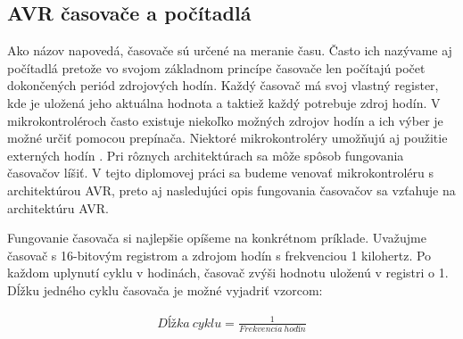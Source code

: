 \subsection{AVR časovače a počítadlá}
\noindent

Ako názov napovedá, časovače sú určené na meranie času. Často ich nazývame aj počítadlá
pretože vo svojom základnom princípe časovače len počítajú počet dokončených periód zdrojových hodín.
Každý časovač má svoj vlastný register, kde je uložená jeho aktuálna hodnota a taktiež každý potrebuje zdroj hodín. V mikrokontroléroch často existuje niekoľko možných zdrojov
hodín a ich výber je možné určiť pomocou prepínača. Niektoré mikrokontroléry umožňujú aj použitie
externých hodín \cite{IntroductionMicrocontrollerTimers}. Pri rôznych architektúrach sa môže spôsob fungovania časovačov líšiť. V tejto diplomovej práci sa budeme venovať
mikrokontroléru s architektúrou AVR, preto aj nasledujúci opis fungovania časovačov sa vzťahuje na architektúru AVR.\par
Fungovanie časovača si najlepšie opíšeme na konkrétnom príklade.
Uvažujme časovač s 16-bitovým registrom a zdrojom hodín s frekvenciou 1 kilohertz. Po každom uplynutí cyklu v hodinách, časovač
zvýši hodnotu uloženú v registri o 1. Dĺžku jedného cyklu časovača je možné vyjadriť vzorcom:

\begin{equation}
    \begin{aligned}
        Dĺžka\:cyklu = \frac{1}{Frekvencia\:hodín}
    \end{aligned}
\end{equation}

